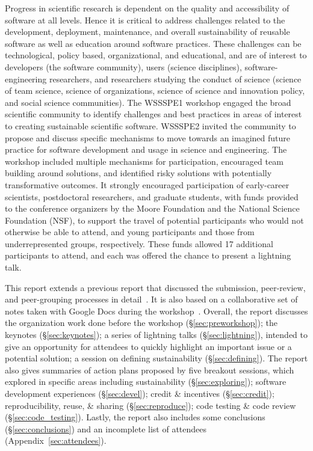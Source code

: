 \documentclass[11pt, oneside]{amsart}
\begin{document}
Progress in scientific research is dependent on the quality and accessibility of
software at all levels. Hence it is critical to address challenges related to
the development, deployment, maintenance, and overall sustainability of reusable
software as well as education around software practices. These challenges can be
technological, policy based, organizational, and educational, and are of
interest to developers (the software community), users (science disciplines),
software-engineering researchers, and researchers studying the conduct of
science (science of team science, science of organizations, science of science
and innovation policy, and social science communities). The WSSSPE1 workshop
engaged the broad scientific community to identify challenges and best practices
in areas of interest to creating sustainable scientific software. WSSSPE2
invited the community to propose and discuss specific mechanisms to move towards
an imagined future practice for software development and usage in science and
engineering. The workshop included multiple mechanisms for participation,
encouraged team building around solutions, and identified risky solutions with
potentially transformative outcomes. It strongly encouraged participation of
early-career scientists, postdoctoral researchers, and graduate students, with
funds provided to the conference organizers by the Moore Foundation and the
National Science Foundation (NSF), to support the travel of potential
participants who would not otherwise be able to attend, and young participants
and those from underrepresented groups, respectively. These funds allowed 17
additional participants to attend, and each was offered the chance to present a
lightning talk.

This report extends a previous report that discussed the submission,
peer-review, and peer-grouping processes in detail~\cite{WSSSPE2-pre-report}. It
is also based on a collaborative set of notes taken with Google Docs during the
workshop~\cite{WSSSPE2-google-notes}. Overall, the report discusses the
organization work done before the workshop (\S\ref{sec:preworkshop}); the
keynotes (\S\ref{sec:keynotes}); a series of lightning talks
(\S\ref{sec:lightning}), intended to give an opportunity for attendees to
quickly highlight an important issue or a potential solution; a session on
defining sustainability (\S\ref{sec:defining}). The report also gives summaries
of action plans proposed by five breakout sessions, which explored in specific
areas including sustainability (\S\ref{sec:exploring}); software development
experiences (\S\ref{sec:devel}); credit \& incentives (\S\ref{sec:credit});
reproducibility, reuse, \& sharing (\S\ref{sec:reproduce}); code testing \& code
review (\S\ref{sec:code_testing}). Lastly, the report also includes some
conclusions (\S\ref{sec:conclusions}) and an incomplete list of attendees
(Appendix~\ref{sec:attendees}).
\end{document}
